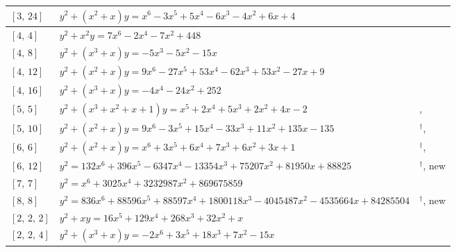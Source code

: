 \documentclass[11pt]{amsart}
\begin{document}
\begin{longtable}{|>{\raggedright\arraybackslash}p{1.7cm}|>{\raggedright\arraybackslash}p{}|>{\raggedright\arraybackslash}p{2.6cm}|}
$[3,\,24]$ & \href{https://alpha.lmfdb.org/Genus2Curve/Q/?jump=[[4,6,-4,-6,5,-3,1],[0,1,1]]}{$y^2 + (x^{2}+x)y = x^{6}-3x^{5}+5x^{4}-6x^{3}-4x^{2}+6x+4$} & \cite{BookerSutherland}\\ \hline
$[4,\,4]$ & \href{https://alpha.lmfdb.org/Genus2Curve/Q/?jump=[[448,0,-7,0,-2,0,7],[0,0,1]]}{$y^2 + x^{2}y = 7x^{6}-2x^{4}-7x^{2}+448$} & \cite{BookerSutherland}\\ \hline
$[4,\,8]$ & \href{https://alpha.lmfdb.org/Genus2Curve/Q/?jump=[[0,-15,-5,-5],[0,1,0,1]]}{$y^2 + (x^{3}+x)y = -5x^{3}-5x^{2}-15x$} & \cite{BookerSutherland}\\ \hline
$[4,\,12]$ & \href{https://alpha.lmfdb.org/Genus2Curve/Q/?jump=[[9,-27,53,-62,53,-27,9],[0,1,1]]}{$y^2 + (x^{2}+x)y = 9x^{6}-27x^{5}+53x^{4}-62x^{3}+53x^{2}-27x+9$} & \cite{BookerSutherland}\\ \hline
$[4,\,16]$ & \href{https://alpha.lmfdb.org/Genus2Curve/Q/?jump=[[252,0,-24,0,-4],[0,1,0,1]]}{$y^2 + (x^{3}+x)y = -4x^{4}-24x^{2}+252$} & \cite{BookerSutherland}\\ \hline
$[5,\,5]$ & \href{https://alpha.lmfdb.org/Genus2Curve/Q/?jump=[[-2,4,2,5,2,1],[1,1,1,1]]}{$y^2 + (x^{3}+x^{2}+x+1)y = x^{5}+2x^{4}+5x^{3}+2x^{2}+4x-2$} & \cite{HLP2000}, \cite{BookerSutherland}\\ \hline
$[5,\,10]$ & \href{https://alpha.lmfdb.org/Genus2Curve/Q/?jump=[[-135,135,11,-33,15,-3,9],[0,1,1]]}{$y^2 + (x^{2}+x)y = 9x^{6}-3x^{5}+15x^{4}-33x^{3}+11x^{2}+135x-135$} & \cite{HLP2000}$^\dagger$, \cite{BookerSutherland}\\ \hline
$[6,\,6]$ & \href{https://www.lmfdb.org/Genus2Curve/Q/196/a/21952/1}{$y^2 + (x^{2}+x)y = x^{6}+3x^{5}+6x^{4}+7x^{3}+6x^{2}+3x+1$} & \cite{HLP2000}$^\dagger$, \cite{BSSVY}\\ \hline
$[6,\,12]$ & $y^2 = 132x^{6}+396x^{5}-6347x^{4}-13354x^{3}+75207x^{2}+81950x+88825$ & \cite{HLP2000}$^\dagger$, new\\ \hline
$[7,\,7]$ & $y^2 = x^{6}+3025x^{4}+3232987x^{2}+869675859$ & \cite{HLP2000}\\ \hline
$[8,\,8]$ & $y^2 = 836x^{6}+88596x^{5}+88597x^{4}+1800118x^{3}-4045487x^{2}-4535664x+84285504$ & \cite{HLP2000}$^\dagger$, new\\ \hline
$[2,\,2,\,2]$ & \href{https://alpha.lmfdb.org/Genus2Curve/Q/?jump=[[0,1,32,268,129,16],[0,1]]}{$y^2 + xy = 16x^{5}+129x^{4}+268x^{3}+32x^{2}+x$} & \cite{BookerSutherland}\\ \hline
$[2,\,2,\,4]$ & \href{https://alpha.lmfdb.org/Genus2Curve/Q/?jump=[[0,-15,7,18,0,3,-2],[0,1,0,1]]}{$y^2 + (x^{3}+x)y = -2x^{6}+3x^{5}+18x^{3}+7x^{2}-15x$} & \cite{BookerSutherland}\\ \hline

\end{longtable}
\end{document}

